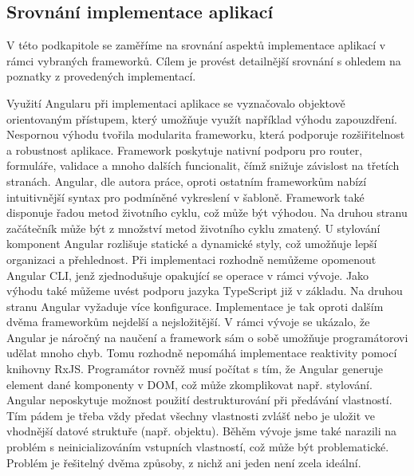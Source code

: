 



\subsection{Srovnání implementace aplikací}

V této podkapitole se zaměříme na srovnání aspektů implementace aplikací v rámci vybraných frameworků. 
Cílem je provést detailnější srovnání s ohledem na poznatky z provedených implementací. 

Využití Angularu při implementaci aplikace se vyznačovalo objektově orientovaným přístupem, který umožňuje využít například výhodu zapouzdření. 
Nespornou výhodu tvořila modularita frameworku, která podporuje rozšiřitelnost a robustnost aplikace. 
Framework poskytuje nativní podporu pro router, formuláře, validace a mnoho dalších funcionalit, čímž snižuje závislost na třetích stranách. 
Angular, dle autora práce, oproti ostatním frameworkům nabízí intuitivnější syntax pro podmíněné vykreslení v šabloně. 
Framework také disponuje řadou metod životního cyklu, což může být výhodou. Na druhou stranu začátečník může být z množství metod životního cyklu zmatený. 
U stylování komponent Angular rozlišuje statické a dynamické styly, což umožňuje lepší organizaci a přehlednost. 
Při implementaci rozhodně nemůžeme opomenout Angular CLI, jenž zjednodušuje opakující se operace v rámci vývoje. 
Jako výhodu také můžeme uvést podporu jazyka TypeScript již v základu. 
Na druhou stranu Angular vyžaduje více konfigurace. Implementace je tak oproti dalším dvěma frameworkům nejdelší a nejsložitější. 
V rámci vývoje se ukázalo, že Angular je náročný na naučení a framework sám o sobě umožňuje programátorovi udělat mnoho chyb. 
Tomu rozhodně nepomáhá implementace reaktivity pomocí knihovny RxJS. 
Programátor rovněž musí počítat s tím, že Angular generuje element dané komponenty v DOM, což může zkomplikovat např. stylování. 
Angular neposkytuje možnost použití destrukturování při předávání vlastností. 
Tím pádem je třeba vždy předat všechny vlastnosti zvlášť nebo je uložit ve vhodnější datové struktuře (např. objektu).
Běhěm vývoje jsme také narazili na problém s neinicializováním vstupních vlastností, což může být problematické. 
Problém je řešitelný dvěma způsoby, z nichž ani jeden není zcela ideální.


